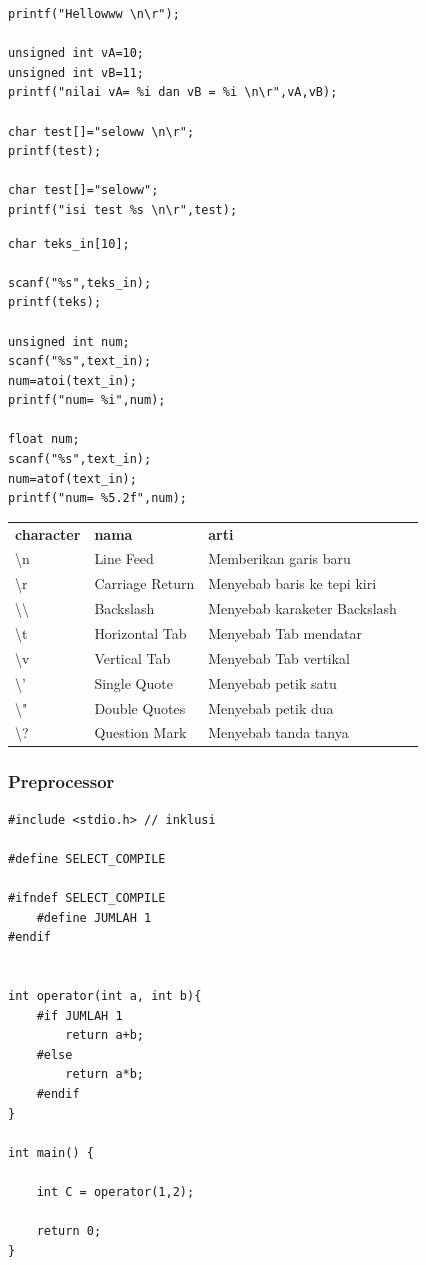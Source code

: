 \documentclass[12pt,]{article}
\begin{document}
	\begin{verbatim}
printf("Hellowww \n\r");

unsigned int vA=10;
unsigned int vB=11;
printf("nilai vA= %i dan vB = %i \n\r",vA,vB);

char test[]="seloww \n\r";
printf(test);

char test[]="seloww";
printf("isi test %s \n\r",test);
	\end{verbatim}

	\begin{verbatim}
char teks_in[10];

scanf("%s",teks_in);
printf(teks);

unsigned int num;
scanf("%s",text_in);
num=atoi(text_in);
printf("num= %i",num);

float num;
scanf("%s",text_in);
num=atof(text_in);
printf("num= %5.2f",num);
	\end{verbatim}

	\begin{table}[H]
		\begin{tabular}{|l|l|l|l}
			\cline{1-3}
			\textbf{character} & \textbf{nama} & \textbf{arti} \\ \cline{1-3}
			\textbackslash n          & Line Feed	   & Memberikan garis baru        \\ \cline{1-3}
			\textbackslash r          & Carriage Return & Menyebab baris ke tepi kiri  \\ \cline{1-3}
			\textbackslash \textbackslash & Backslash       & Menyebab karaketer Backslash \\ \cline{1-3}
			\textbackslash t          & Horizontal Tab  & Menyebab Tab mendatar        \\ \cline{1-3}
			\textbackslash v          & Vertical Tab    & Menyebab Tab vertikal        \\ \cline{1-3}
			\textbackslash '          & Single Quote    & Menyebab petik satu          \\ \cline{1-3}
			\textbackslash "          & Double Quotes   & Menyebab petik dua           \\ \cline{1-3}
			\textbackslash ?          & Question Mark   & Menyebab tanda tanya         \\ \cline{1-3}
		\end{tabular}
	\end{table}

	\newpage
	\subsubsection{Preprocessor}
	\begin{verbatim}
#include <stdio.h> // inklusi

#define SELECT_COMPILE

#ifndef SELECT_COMPILE
	#define JUMLAH 1
#endif


int operator(int a, int b){
	#if JUMLAH 1
		return a+b;
	#else
		return a*b;
	#endif
}

int main() {

	int C = operator(1,2);

	return 0;
}
	\end{verbatim}
\end{document}
